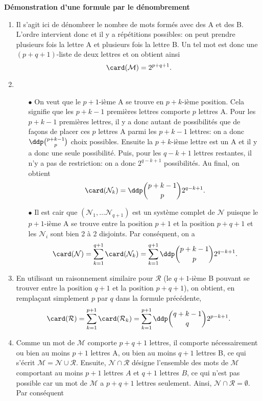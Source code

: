 \documentclass[a4paper, 11pt]{article}
\begin{document}
\begin{correction}  \; \textbf{D\'emonstration d'une formule par le d\'enombrement}
	\begin{enumerate}
		\item Il s'agit ici de d\'enombrer le nombre de mots form\'es avec des A et des B. L'ordre intervient donc et il y a r\'ep\'etitions possibles:
		      on peut prendre plusieurs fois la lettre A et plusieurs fois la lettre B. Un tel mot est donc une $(p+q+1)$-liste de deux lettres et on obtient ainsi
		      $$\card (\mathcal{M})=2^{p+q+1}.$$
		\item
		      \begin{itemize}
			      \item[$\bullet$] On veut que le $p+1$-i\`eme A se trouve en $p+k$-i\`eme position. Cela signifie que les $p+k-1$ premi\`eres lettres comporte
				      $p$ lettres A. Pour les $p+k-1$ premi\`eres lettres, il y a donc autant de possibilit\'es que de fa\c{c}ons de placer ces $p$ lettres A parmi les $p+k-1$ lettres: on a donc $\ddp \binom{p+k-1}{p}$ choix possibles. Ensuite la $p+k$-i\`eme lettre est un A et il y a donc une seule possibilit\'e. Puis, pour les $q-k+1$ lettres restantes, il n'y a pas de restriction: on a donc $2^{q-k+1}$ possibilit\'es. Au final, on obtient
				      $$\card (\mathcal{N}_k)= \ddp \binom{p+k-1}{p}2^{q-k+1}.$$
			      \item[$\bullet$]  Il est cair que $\left( \mathcal{N}_1,\dots \mathcal{N}_{q+1} \right)$ est un syst\`eme complet de $\mathcal{N}$ puisque le $p+1$-i\`eme A se trouve entre la position $p+1$ et la position $p+q+1$ et les $\mathcal{N}_i$ sont bien 2 \`a 2 disjoints. Par cons\'equent, on a
				      $$\card (\mathcal{N})=\sum\limits_{k=1}^{q+1}\card(\mathcal{N}_k)=\sum\limits_{k=1}^{q+1} \ddp \binom{p+k-1}{p}2^{q-k+1}.$$
		      \end{itemize}
		\item En utilisant un raisonnement similaire pour $\mathcal{R}$ (le $q+1$-i\`eme B pouvant se trouver entre la position $q+1$ et la position $p+q+1$), on obtient, en rempla\c{c}ant simplement $p$ par $q$ dans la formule pr\'ec\'edente,
		      $$\card (\mathcal{R})=\sum\limits_{k=1}^{p+1}\card(\mathcal{R}_k)=\sum\limits_{k=1}^{p+1} \ddp \binom{q+k-1}{q}2^{p-k+1}.$$
		\item Comme un mot de $\mathcal{M}$ comporte $p+q+1$ lettres, il comporte n\'ecessairement ou bien au moins $p+1$ lettres A, ou bien au moins $q+1$ lettres B, ce qui s'\'ecrit $\mathcal{M}=\mathcal{N}\cup\mathcal{R}$. Ensuite, $\mathcal{N}\cap \mathcal{R}$ d\'esigne l'ensemble des mots de $\mathcal{M}$ comportant au moins $p+1$ lettres $A$ et $q+1$ lettres $B$, ce qui n'est pas possible car un mot de $\mathcal{M}$ a $p+q+1$ lettres seulement. Ainsi, $\mathcal{N}\cap\mathcal{R}=\emptyset$. Par cons\'equent

\end{enumerate}
\end{correction}
\end{document}
